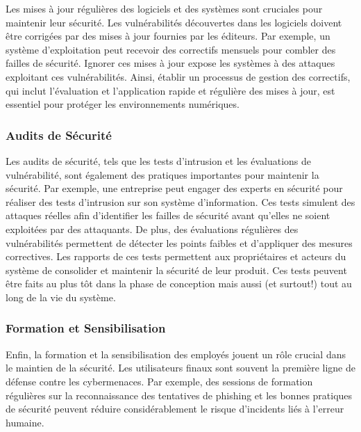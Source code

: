 Les mises à jour régulières des logiciels et des systèmes sont cruciales pour maintenir leur sécurité. Les vulnérabilités découvertes dans les logiciels doivent être corrigées par des mises à jour fournies par les éditeurs. Par exemple, un système d'exploitation peut recevoir des correctifs mensuels pour combler des failles de sécurité. Ignorer ces mises à jour expose les systèmes à des attaques exploitant ces vulnérabilités. Ainsi, établir un processus de gestion des correctifs, qui inclut l'évaluation et l'application rapide et régulière des mises à jour, est essentiel pour protéger les environnements numériques.

\subsubsection{Audits de Sécurité}

Les audits de sécurité, tels que les tests d'intrusion et les évaluations de vulnérabilité, sont également des pratiques importantes pour maintenir la sécurité. Par exemple, une entreprise peut engager des experts en sécurité pour réaliser des tests d'intrusion sur son système d'information. Ces tests simulent des attaques réelles afin d'identifier les failles de sécurité avant qu'elles ne soient exploitées par des attaquants. De plus, des évaluations régulières des vulnérabilités permettent de détecter les points faibles et d'appliquer des mesures correctives. Les rapports de ces tests permettent aux propriétaires et acteurs du système de consolider et maintenir la sécurité de leur produit. Ces tests peuvent être faits au plus tôt dans la phase de conception mais aussi (et surtout!) tout au long de la vie du système.

\subsubsection{Formation et Sensibilisation}

Enfin, la formation et la sensibilisation des employés jouent un rôle crucial dans le maintien de la sécurité. Les utilisateurs finaux sont souvent la première ligne de défense contre les cybermenaces. Par exemple, des sessions de formation régulières sur la reconnaissance des tentatives de phishing et les bonnes pratiques de sécurité peuvent réduire considérablement le risque d'incidents liés à l'erreur humaine.

